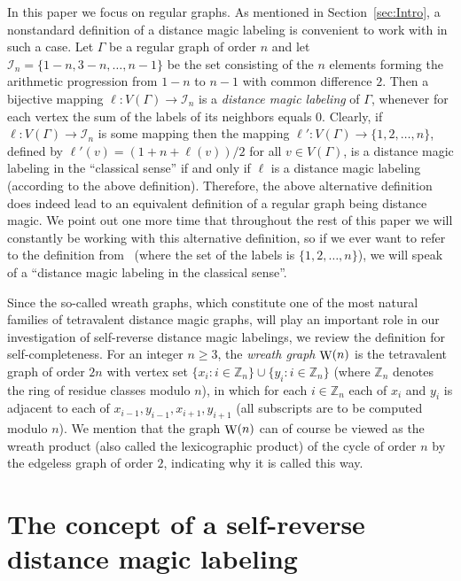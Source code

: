 \documentclass[11 pt,english]{article}
\newcommand{\ZZ}{\mathbb{Z}}
\newcommand{\G}{\Gamma}
\newcommand{\Wr}{\mathop{\rm W}}
\theoremstyle{definition}
\begin{document}
In this paper we focus on regular graphs. As mentioned in Section~\ref{sec:Intro}, a nonstandard definition of a distance magic labeling is convenient to work with in such a case. Let $\G$ be a regular graph of order $n$ and let $\mathcal{I}_n = \{1-n, 3-n, \ldots , n-1\}$ be the set consisting of the $n$ elements forming the arithmetic progression from $1-n$ to $n-1$ with common difference $2$. Then a bijective mapping $\ell \colon V(\G) \to \mathcal{I}_n$ is a {\em distance magic labeling} of $\G$, whenever for each vertex the sum of the labels of its neighbors equals $0$. Clearly, if $\ell \colon V(\G) \to \mathcal{I}_n$ is some mapping then the mapping $\ell' \colon V(\G) \to \{1,2,\ldots , n\}$, defined by $\ell'(v) = (1+n+\ell(v))/2$ for all $v \in V(\G)$, is a distance magic labeling in the ``classical sense'' if and only if $\ell$ is a distance magic labeling (according to the above definition). Therefore, the above alternative definition does indeed lead to an equivalent definition of a regular graph being distance magic. We point out one more time that throughout the rest of this paper we will constantly be working with this alternative definition, so if we ever want to refer to the definition from~\cite{SugFroMilRyaWal09} (where the set of the labels is $\{1,2,\ldots , n\}$), we will speak of a ``distance magic labeling in the classical sense''. 

Since the so-called wreath graphs, which constitute one of the most natural families of tetravalent distance magic graphs, will play an important role in our investigation of self-reverse distance magic labelings, we review the definition for self-completeness. For an integer $n \geq 3$, the {\em wreath graph} $\Wr(n)$ is the tetravalent graph of order $2n$ with vertex set $\{x_i \colon i \in \ZZ_n\} \cup \{y_i \colon i \in \ZZ_n\}$ (where $\ZZ_n$ denotes the ring of residue classes modulo $n$), in which for each $i \in \ZZ_n$ each of $x_i$ and $y_i$ is adjacent to each of $x_{i-1}, y_{i-1}, x_{i+1}, y_{i+1}$ (all subscripts are to be computed modulo $n$). We mention that the graph $\Wr(n)$ can of course be viewed as the wreath product (also called the lexicographic product) of the cycle of order $n$ by the edgeless graph of order $2$, indicating why it is called this way.



\section{The concept of a self-reverse distance magic labeling}
\label{sec:Self}
\end{document}
